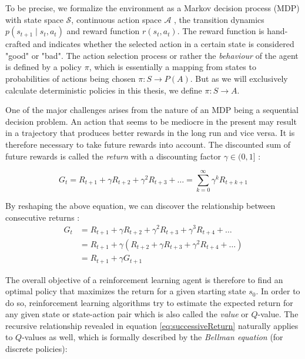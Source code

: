 To be precise, we formalize the environment as a Markov decision process (MDP) with state space $\mathcal{S}$, continuous action space $\mathcal{A}$ , the transition dynamics $p(s_{t+1} \mid s_t, a_t)$ and reward function $r(s_t, a_t)$. The reward function is hand-crafted and indicates whether the selected action in a certain state is considered "good" or "bad". The action selection process or rather the \textit{behaviour} of the agent is defined by a policy $\pi$, which is essentially a mapping from states to probabilities of actions being chosen $\pi: S \rightarrow P(A)$. But as we will exclusively calculate deterministic policies in this thesis, we define $\pi: S \rightarrow A$.
\par 
One of the major challenges arises from the nature of an MDP being a sequential decision problem. An action that seems to be mediocre in the present may result in a trajectory that produces better rewards in the long run and vice versa. It is therefore necessary to take future rewards into account. The discounted sum of future rewards is called the \textit{return} with a discounting factor $\gamma \in (0,1]$  \cite[p.55]{Sutton1998}:

\begin{equation}\label{eq:discountedReturn}
    G_t = R_{t+1} + \gamma R_{t+2} + \gamma^2 R_{t+3} + \dots  = \sum_{k=0}^\infty{\gamma^k R_{t+k+1}}
\end{equation}

By reshaping the above equation, we can discover the relationship between consecutive returns \cite[p.55]{Sutton1998}:
\begin{equation}\label{eq:successiveReturn}
    \begin{aligned}
    G_t &= R_{t+1} + \gamma R_{t+2} + \gamma^2 R_{t+3} + \gamma^3 R_{t+4} + \dots \\
    &= R_{t+1} + \gamma (R_{t+2} + \gamma R_{t+3} + \gamma^2 R_{t+4} + \dots)  \\
   & = R_{t+1} + \gamma G_{t+1}
    \end{aligned}
\end{equation}

The overall objective of a reinforcement learning agent is therefore to find an optimal policy that maximizes the return for a given starting state $s_0$. In order to do so, reinforcement learning algorithms try to estimate the expected return for any given state or state-action pair which is also called the \textit{value} or $Q$-value. The recursive relationship revealed in equation \ref{eq:successiveReturn} naturally applies to $Q$-values as well, which is formally described by the \textit{Bellman equation} (for discrete policies):

